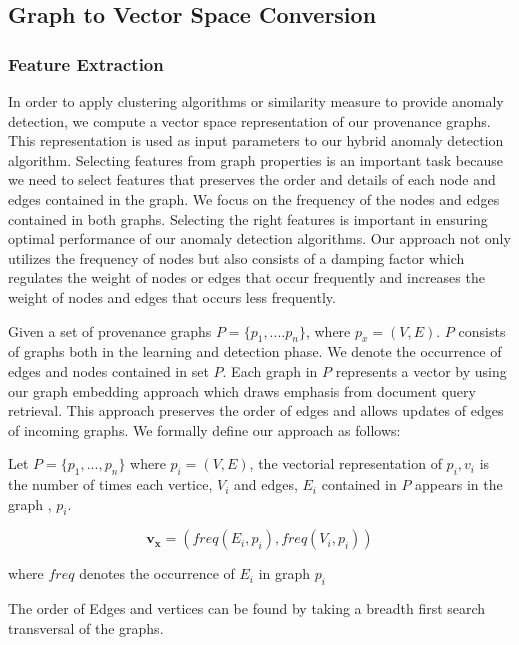 \subsection{Graph to Vector Space Conversion }

\subsubsection{Feature Extraction}

In order to apply clustering algorithms or similarity measure to provide anomaly detection, we compute a vector space representation of our provenance graphs. This representation is used as input parameters to our hybrid anomaly detection algorithm. Selecting features from graph properties is an important task because we need to select features that preserves the order and details of each node and edges contained in the graph. We focus on the frequency of the nodes and edges contained in both graphs. Selecting the right features is important in ensuring optimal performance of our anomaly detection algorithms. Our approach not only utilizes the frequency of nodes but also consists of a damping factor which regulates the weight of nodes or edges that occur frequently and increases the weight of nodes and edges that occurs less frequently.  
 

\par Given a set of provenance graphs $P = \{p_1,....p_n \} $, where $p_x = (V, E)$. $P$ consists of graphs both in the learning and detection phase. We denote the occurrence of edges and nodes contained in set $P$. Each graph in $P$ represents a vector by using our graph embedding approach which draws emphasis from document query retrieval. This approach preserves the order of edges and allows updates of edges of incoming graphs. We  formally define our approach as follows:


\begin{definition}

Let $P = \{p_1,...,p_n\}$ where $p_i = (V, E)$, the vectorial representation of $p_i, v_{i}$ is the number of times each vertice, $V_i$ and edges, $E_i$ contained in $P$ appears in the graph , $p_i$.

\[ \boldsymbol{v_x} = ( freq(E_i, p_i), freq(V_i, p_i)) \]

where $freq$ denotes the occurrence of $E_i$ in graph $p_i$

\end{definition}

The order of Edges and vertices can be found by taking a breadth first search transversal of the graphs.


